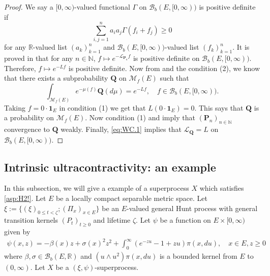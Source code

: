\documentclass[12pt,a4paper]{amsart}
\numberwithin{equation}{section}
\theoremstyle{plain}
\theoremstyle{definition}
\theoremstyle{remark}
\begin{document}
\begin{proof}
	We say a $[0,\infty)$-valued functional $\Gamma$ on $\mathcal B_b(E,[0,\infty))$ is positive definite if
\[
\sum_{i,j =1}^n a_i a_j \Gamma (f_i + f_j)\geq 0
\]
for any $\mathbb R$-valued list $(a_k)_{k = 1}^n$ and $\mathcal B_b(E,[0,\infty))$-valued list $(f_k)_{k = 1}^n$.
	It is proved in \cite[Theorem 3.3.3]{Dawson1992Infinitely} that for any $n \in \mathbb N$, $f\mapsto e^{- \mathscr L_{\mathbf P_n}f}$ is positive definite on $\mathcal B_b(E,[0,\infty))$.
	Therefore, $f \mapsto e^{- L f}$ is positive definite.
	Now from \cite[Corollary (A.6)]{Fitzsimmons1989Construction} and the condition (2), we know that there exists a subprobability $\mathbf Q$ on $\mathcal M_f(E)$ such that
\begin{equation}	\label{eq:WC.1}
	\int_{\mathcal M_f(E)}e^{-\mu(f) } \mathbf Q(d\mu) = e^{-Lf}, \quad f \in \mathcal B_b(E,[0,\infty)).
\end{equation}
	Taking $f = 0 \cdot \mathbf 1_E$ in condition (1) we get that $L(0\cdot \mathbf 1_E) = 0$.
	This says that $\mathbf Q$ is a probability on $\mathcal M_f(E)$.
	Now condition (1) and \cite[Theorem 1.8]{Li2011MeasureValued} imply that $(\mathbf P_n)_{n \in \mathbb N}$ convergence to $\mathbf Q$ weakly.
	Finally, \eqref{eq:WC.1} implies that $\mathscr L_{\mathbf Q} = L$ on $\mathcal B_b(E,[0,\infty))$.
\end{proof}

\subsection{Intrinsic ultracontractivity: an example} \label{sec:example}
	In this subsection, we will give a example of a superprocess $X$ which satisfies \eqref{asp:H2!}.
	Let $E$ be a locally compact separable metric space.
	Let $\xi:= \{(\xi)_{0\leq t < \zeta}; (\Pi_x)_{x\in E}\}$ be an $E$-valued general Hunt process with general transition kernels $(P_t)_{t\geq 0}$ and lifetime $\zeta$.
	Let $\psi$ be a function on $E \times [0,\infty)$ given by
\begin{align}
	\psi(x,z)
	=- \beta(x) z + \sigma(x)^2 z^2 + \int_0^\infty (e^{-zu} -1 + zu) \pi(x,du),
	\quad x\in E, z\geq 0
\end{align}
	where $\beta, \sigma \in \mathcal B_b(E,\mathbb R)$ and $(u \wedge u^2) \pi(x,du)$ is a bounded kernel from $E$ to $(0,\infty)$.
	Let $X$ be a $(\xi, \psi)$-superprocess.
\end{document}
